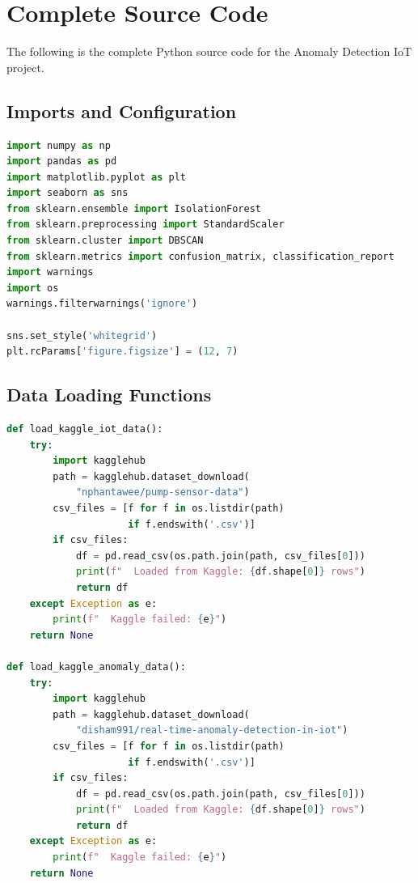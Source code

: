 \documentclass[12pt,a4paper]{report}
\begin{document}
\appendix
\chapter{Complete Source Code}
\label{app:source_code}

The following is the complete Python source code for the Anomaly Detection IoT project.

\section{Imports and Configuration}
\begin{lstlisting}[language=Python, caption={Library imports and global settings}]
import numpy as np
import pandas as pd
import matplotlib.pyplot as plt
import seaborn as sns
from sklearn.ensemble import IsolationForest
from sklearn.preprocessing import StandardScaler
from sklearn.cluster import DBSCAN
from sklearn.metrics import confusion_matrix, classification_report
import warnings
import os
warnings.filterwarnings('ignore')

sns.set_style('whitegrid')
plt.rcParams['figure.figsize'] = (12, 7)
\end{lstlisting}

\section{Data Loading Functions}
\begin{lstlisting}[language=Python, caption={Kaggle IoT data loaders}]
def load_kaggle_iot_data():
    try:
        import kagglehub
        path = kagglehub.dataset_download(
            "nphantawee/pump-sensor-data")
        csv_files = [f for f in os.listdir(path)
                     if f.endswith('.csv')]
        if csv_files:
            df = pd.read_csv(os.path.join(path, csv_files[0]))
            print(f"  Loaded from Kaggle: {df.shape[0]} rows")
            return df
    except Exception as e:
        print(f"  Kaggle failed: {e}")
    return None

def load_kaggle_anomaly_data():
    try:
        import kagglehub
        path = kagglehub.dataset_download(
            "disham991/real-time-anomaly-detection-in-iot")
        csv_files = [f for f in os.listdir(path)
                     if f.endswith('.csv')]
        if csv_files:
            df = pd.read_csv(os.path.join(path, csv_files[0]))
            print(f"  Loaded from Kaggle: {df.shape[0]} rows")
            return df
    except Exception as e:
        print(f"  Kaggle failed: {e}")
    return None
\end{lstlisting}
\end{document}
